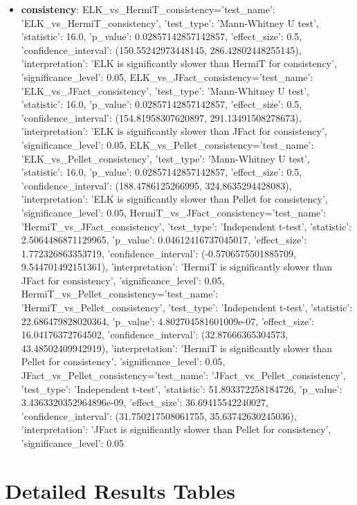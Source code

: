 \documentclass[11pt,a4paper]{{article}}
\begin{document}
\begin{itemize}
    \item \textbf{consistency}: ELK_vs_HermiT_consistency={'test_name': 'ELK_vs_HermiT_consistency', 'test_type': 'Mann-Whitney U test', 'statistic': 16.0, 'p_value': 0.02857142857142857, 'effect_size': 0.5, 'confidence_interval': (150.55242973448145, 286.42802448255145), 'interpretation': 'ELK is significantly slower than HermiT for consistency', 'significance_level': 0.05}, ELK_vs_JFact_consistency={'test_name': 'ELK_vs_JFact_consistency', 'test_type': 'Mann-Whitney U test', 'statistic': 16.0, 'p_value': 0.02857142857142857, 'effect_size': 0.5, 'confidence_interval': (154.81958307620897, 291.13491508278673), 'interpretation': 'ELK is significantly slower than JFact for consistency', 'significance_level': 0.05}, ELK_vs_Pellet_consistency={'test_name': 'ELK_vs_Pellet_consistency', 'test_type': 'Mann-Whitney U test', 'statistic': 16.0, 'p_value': 0.02857142857142857, 'effect_size': 0.5, 'confidence_interval': (188.4786125266995, 324.8635294428083), 'interpretation': 'ELK is significantly slower than Pellet for consistency', 'significance_level': 0.05}, HermiT_vs_JFact_consistency={'test_name': 'HermiT_vs_JFact_consistency', 'test_type': 'Independent t-test', 'statistic': 2.5064486871129965, 'p_value': 0.04612416737045017, 'effect_size': 1.772326863353719, 'confidence_interval': (-0.5706575501885709, 9.544701492151361), 'interpretation': 'HermiT is significantly slower than JFact for consistency', 'significance_level': 0.05}, HermiT_vs_Pellet_consistency={'test_name': 'HermiT_vs_Pellet_consistency', 'test_type': 'Independent t-test', 'statistic': 22.686479828020364, 'p_value': 4.802704581601009e-07, 'effect_size': 16.04176372764502, 'confidence_interval': (32.87666365304573, 43.48502409942919), 'interpretation': 'HermiT is significantly slower than Pellet for consistency', 'significance_level': 0.05}, JFact_vs_Pellet_consistency={'test_name': 'JFact_vs_Pellet_consistency', 'test_type': 'Independent t-test', 'statistic': 51.893372258184726, 'p_value': 3.4363320352964896e-09, 'effect_size': 36.69415542240027, 'confidence_interval': (31.750217508061755, 35.63742630245036), 'interpretation': 'JFact is significantly slower than Pellet for consistency', 'significance_level': 0.05}
\end{itemize}



\section{Detailed Results Tables}
\end{document}
